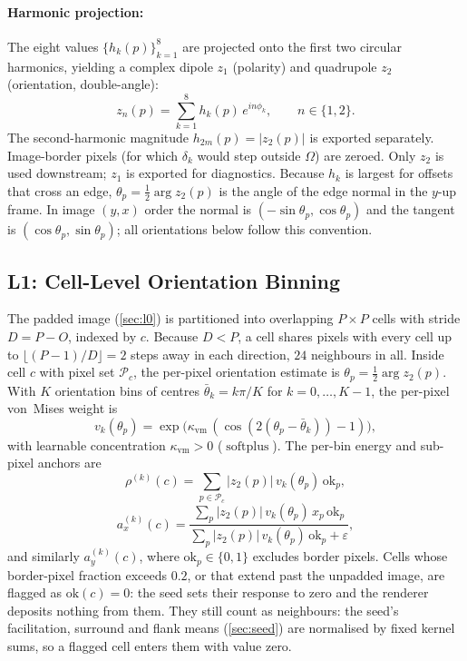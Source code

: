 \documentclass[11pt,a4paper]{article}
\newcommand{\abs}[1]{\left\lvert#1\right\rvert}
\newcommand{\softplus}{\operatorname{softplus}}
\begin{document}
\paragraph{Harmonic projection:}
The eight values $\{h_k(p)\}_{k=1}^{8}$ are projected onto the first two circular harmonics, yielding a complex dipole $z_1$ (polarity) and quadrupole $z_2$ (orientation, double-angle):
\begin{equation}\label{eq:zn}
  \boxed{\;
  z_n(p) = \sum_{k=1}^{8} h_k(p)\, e^{i n \phi_k},
  \qquad n \in \{1, 2\}.\;}
\end{equation}
The second-harmonic magnitude $h_{2m}(p) = \abs{z_2(p)}$ is exported separately. Image-border pixels (for which $\delta_k$ would step outside $\Omega$) are zeroed. Only $z_2$ is used downstream; $z_1$ is exported for diagnostics. Because $h_k$ is largest for offsets that cross an edge, $\theta_p = \tfrac{1}{2}\arg z_2(p)$ is the angle of the edge normal in the $y$-up frame. In image $(y, x)$ order the normal is $(-\sin\theta_p, \cos\theta_p)$ and the tangent is $(\cos\theta_p, \sin\theta_p)$; all orientations below follow this convention.

\subsection{L1: Cell-Level Orientation Binning}\label{sec:l1}

The padded image (\cref{sec:l0}) is partitioned into overlapping $P{\times}P$ cells with stride $D = P - O$, indexed by $c$. Because $D < P$, a cell shares pixels with every cell up to $\lfloor (P - 1)/D \rfloor = 2$ steps away in each direction, $24$ neighbours in all. Inside cell $c$ with pixel set $\mathcal{P}_c$, the per-pixel orientation estimate is $\theta_p = \tfrac{1}{2}\arg z_2(p)$. With $K$ orientation bins of centres $\bar\theta_k = k\pi/K$ for $k=0,\dots,K-1$, the per-pixel von~Mises weight is
\begin{equation}\label{eq:vm-weight}
  v_k(\theta_p) = \exp\!\bigl(\kappa_{\mathrm{vm}}\,(\cos(2(\theta_p - \bar\theta_k)) - 1)\bigr),
\end{equation}
with learnable concentration $\kappa_{\mathrm{vm}} > 0$ ($\softplus$). The per-bin energy and sub-pixel anchors are
\begin{equation}\label{eq:rho-bin}
  \boxed{\;
  \rho^{(k)}(c) = \sum_{p \in \mathcal{P}_c} \abs{z_2(p)}\, v_k(\theta_p)\, \mathrm{ok}_p,\;}
\end{equation}
\begin{equation}\label{eq:anchor-bin}
  a_x^{(k)}(c) = \frac{\sum_{p} \abs{z_2(p)}\, v_k(\theta_p)\, x_p\, \mathrm{ok}_p}{\sum_{p} \abs{z_2(p)}\, v_k(\theta_p)\, \mathrm{ok}_p + \varepsilon},
\end{equation}
and similarly $a_y^{(k)}(c)$, where $\mathrm{ok}_p \in \{0,1\}$ excludes border pixels. Cells whose border-pixel fraction exceeds $0.2$, or that extend past the unpadded image, are flagged as $\mathrm{ok}(c) = 0$: the seed sets their response to zero and the renderer deposits nothing from them. They still count as neighbours: the seed's facilitation, surround and flank means (\cref{sec:seed}) are normalised by fixed kernel sums, so a flagged cell enters them with value zero.
\end{document}
